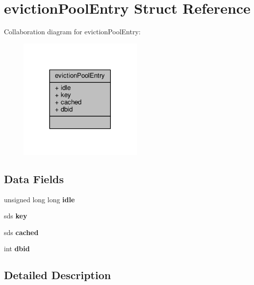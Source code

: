 \hypertarget{structevictionPoolEntry}{}\section{eviction\+Pool\+Entry Struct Reference}
\label{structevictionPoolEntry}


Collaboration diagram for eviction\+Pool\+Entry\+:\nopagebreak
\begin{figure}[H]
\begin{center}
\leavevmode
\includegraphics[width=173pt]{structevictionPoolEntry__coll__graph}
\end{center}
\end{figure}
\subsection*{Data Fields}
\begin{DoxyCompactItemize}
\item 
\mbox{\label{structevictionPoolEntry_a1684112289f68796969533d55668564f}} 
unsigned long long {\bfseries idle}
\item 
\mbox{\label{structevictionPoolEntry_ab2dd4d387743e8435f5a50f66ae9c9f1}} 
sds {\bfseries key}
\item 
\mbox{\label{structevictionPoolEntry_a57611fdc5a655a808616731b051dd62c}} 
sds {\bfseries cached}
\item 
\mbox{\label{structevictionPoolEntry_a4d28f9d176d4047641f2153b0f7af294}} 
int {\bfseries dbid}
\end{DoxyCompactItemize}


\subsection{Detailed Description}


